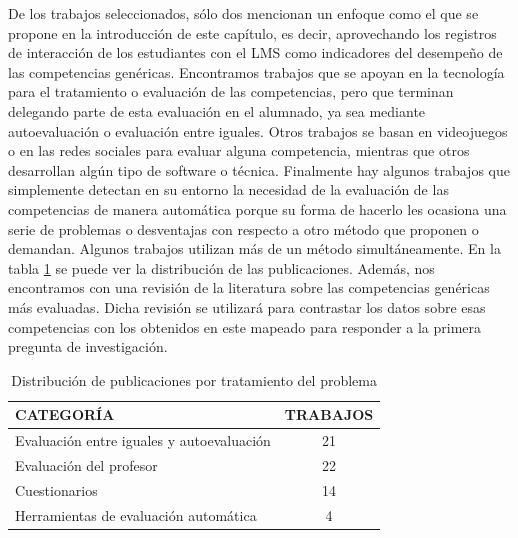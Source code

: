 De los trabajos seleccionados, sólo dos mencionan un enfoque como el que se propone en la introducción de este capítulo, es decir, aprovechando los registros de interacción de los estudiantes con el LMS como indicadores del desempeño de las competencias genéricas. Encontramos trabajos que se apoyan en la tecnología para el tratamiento o evaluación de las competencias, pero que terminan delegando parte de esta evaluación en el alumnado, ya sea mediante autoevaluación o evaluación entre iguales. Otros trabajos se basan en videojuegos o en las redes sociales para evaluar alguna competencia, mientras que otros desarrollan algún tipo de software o técnica. Finalmente hay algunos trabajos que simplemente detectan en su entorno la necesidad de la evaluación de las competencias de manera automática porque su forma de hacerlo les ocasiona una serie de problemas o desventajas con respecto a otro método que proponen o demandan. Algunos trabajos utilizan más de un método simultáneamente. En la tabla \ref{tab:PublicacionesForum} se puede ver la distribución de las publicaciones. Además, nos encontramos con una revisión de la literatura sobre las competencias genéricas más evaluadas. Dicha revisión se utilizará para contrastar los datos sobre esas competencias con los obtenidos en este mapeado para responder a la primera pregunta de investigación. %

\begin{table}
  \begin{center}
  \begin{tabular}{| m{10cm} | c |}
    \hline
    CATEGORÍA & TRABAJOS\\
    \hline
    \hline 
    Evaluación entre iguales y autoevaluación & 21\\
    \hline
    Evaluación del profesor & 22\\
    \hline
    Cuestionarios & 14\\
    \hline
    Herramientas de evaluación automática & 4\\
    \hline
  \end{tabular}
\end{center}
\caption{Distribución de publicaciones por tratamiento del problema}
\label{tab:PublicacionesForum}
\end{table} 


